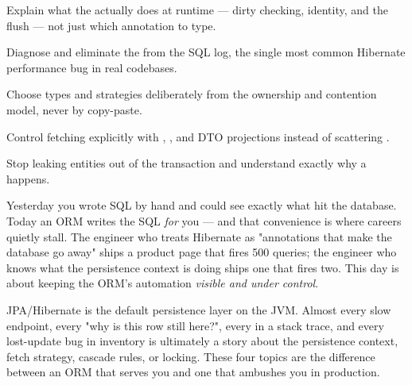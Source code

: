 
\begin{objectives}
\begin{wbitem}
  \item Explain what the  actually does at runtime — dirty checking, identity, and the flush — not just which annotation to type.
  \item Diagnose and eliminate the  from the SQL log, the single most common Hibernate performance bug in real codebases.
  \item Choose  types and  strategies deliberately from the ownership and contention model, never by copy-paste.
  \item Control fetching explicitly with , , and DTO projections instead of scattering .
  \item Stop leaking entities out of the transaction and understand exactly why a  happens.
\end{wbitem}
\end{objectives}


 Yesterday you wrote SQL by hand and could see exactly what hit the database. Today an ORM writes the SQL \emph{for} you --- and that convenience is where careers quietly stall. The engineer who treats Hibernate as "annotations that make the database go away" ships a product page that fires 500 queries; the engineer who knows what the persistence context is doing ships one that fires two. This day is about keeping the ORM's automation \emph{visible and under control}.

 JPA/Hibernate is the default persistence layer on the JVM. Almost every slow endpoint, every "why is this row still here?", every  in a stack trace, and every lost-update bug in inventory is ultimately a story about the persistence context, fetch strategy, cascade rules, or locking. These four topics are the difference between an ORM that serves you and one that ambushes you in production.

